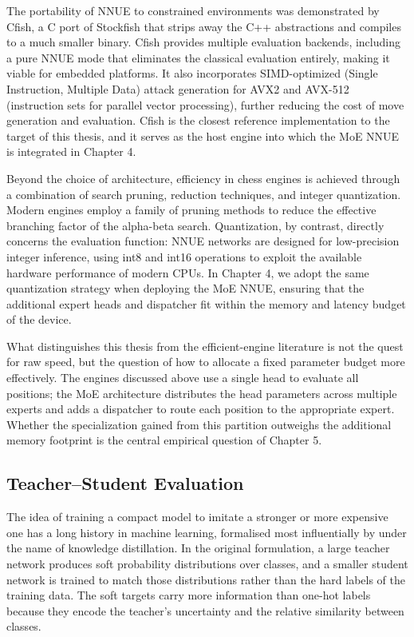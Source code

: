 The portability of NNUE to constrained environments was demonstrated by Cfish, a C port of Stockfish that strips away the C++ abstractions and compiles to a much smaller binary. Cfish provides multiple evaluation backends, including a pure NNUE mode that eliminates the classical evaluation entirely, making it viable for embedded platforms. It also incorporates SIMD-optimized (Single Instruction, Multiple Data) attack generation for AVX2 and AVX-512 (instruction sets for parallel vector processing), further reducing the cost of move generation and evaluation. Cfish is the closest reference implementation to the target of this thesis, and it serves as the host engine into which the MoE NNUE is integrated in Chapter 4.

Beyond the choice of architecture, efficiency in chess engines is achieved through a combination of search pruning, reduction techniques, and integer quantization. Modern engines employ a family of pruning methods to reduce the effective branching factor of the alpha-beta search. Quantization, by contrast, directly concerns the evaluation function: NNUE networks are designed for low-precision integer inference, using int8 and int16 operations to exploit the available hardware performance of modern CPUs. In Chapter 4, we adopt the same quantization strategy when deploying the MoE NNUE, ensuring that the additional expert heads and dispatcher fit within the memory and latency budget of the device.

What distinguishes this thesis from the efficient-engine literature is not the quest for raw speed, but the question of how to allocate a fixed parameter budget more effectively. The engines discussed above use a single head to evaluate all positions; the MoE architecture distributes the head parameters across multiple experts and adds a dispatcher to route each position to the appropriate expert. Whether the specialization gained from this partition outweighs the additional memory footprint is the central empirical question of Chapter 5.

\subsection{Teacher--Student Evaluation}
The idea of training a compact model to imitate a stronger or more expensive one has a long history in machine learning, formalised most influentially by \textbf{\textcite{hinton2015}} under the name of knowledge distillation. In the original formulation, a large teacher network produces soft probability distributions over classes, and a smaller student network is trained to match those distributions rather than the hard labels of the training data. The soft targets carry more information than one-hot labels because they encode the teacher's uncertainty and the relative similarity between classes.

